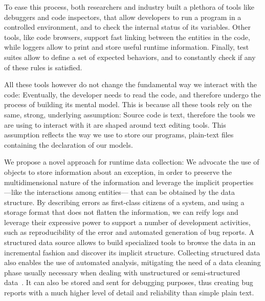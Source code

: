 To ease this process, both researchers and industry built a plethora of tools like debuggers and code inspectors, that allow developers to run a program in a controlled environment, and to check the internal status of its variables.
Other tools, like code browsers, support fast linking between the entities in the code, while loggers allow to print and store useful runtime information.
Finally, test suites allow to define a set of expected behaviors, and to constantly check if any of these rules is satisfied.

All these tools however do not change the fundamental way we interact with the code: Eventually, the developer needs to read the code, and therefore undergo the process of building its mental model.
This is because all these tools rely on the same, strong, underlying assumption: Source code is text, therefore the tools we are using to interact with it are shaped around text editing tools.
This assumption reflects the way we use to store our programs, \ie plain-text files containing the declaration of our models.

We propose a novel approach for runtime data collection: We advocate the use of objects to store information about an exception, in order to preserve the multidimensional nature of the information and leverage the implicit properties ---like the interactions among entities--- that can be obtained by the data structure.
By describing errors as first-class citizens of a system, and using a storage format that does not flatten the information, we can reify logs and leverage their expressive power to support a number of development activities, such as reproducibility of the error and automated generation of bug reports.
A structured data source allows to build specialized tools to browse the data in an incremental fashion and discover its implicit structure.
Collecting structured data also enables the use of automated analysis, mitigating the need of a data cleaning phase usually necessary when dealing with unstructured or semi-structured data~\cite{Bacc2012a}.
It can also be stored and sent for debugging purposes, thus creating bug reports with a much higher level of detail and reliability than simple plain text.



